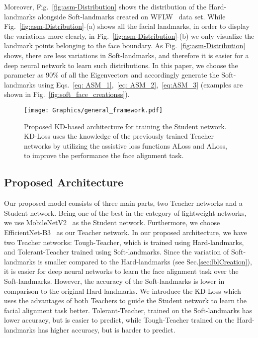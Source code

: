 \documentclass[times,twocolumn,final,authoryear]{elsarticle}
\begin{document}
Moreover, Fig.~\ref{fig:asm-Distribution} shows the distribution of the Hard-landmarks alongside Soft-landmarks created on WFLW~\cite{wu2018look} data set. While Fig.~\ref{fig:asm-Distribution}-(a) shows all the facial landmarks, in order to display the variations more clearly, in Fig.~\ref{fig:asm-Distribution}-(b) we only visualize the landmark points belonging to the face boundary. As Fig.~\ref{fig:asm-Distribution} shows, there are less variations in Soft-landmarks, and therefore it is easier for a deep neural network to learn such distributions. In this paper, we choose the parameter  as 90\% of all the Eigenvectors and accordingly generate the Soft-landmarks using Eqs.~\ref{eq: ASM_1},~\ref{eq: ASM_2},~\ref{eq:ASM_3} (examples are shown in Fig.~\ref{fig:soft_face_creationss}).

\begin{figure}[t!]
  \centering
  \texttt{[image: Graphics/general\_framework.pdf]}
  \caption{Proposed KD-based architecture for training the Student network. KD-Loss uses the knowledge of the previously trained Teacher networks by utilizing the assistive loss functions ALoss and ALoss, to improve the performance the face alignment task.}
  \label{fig:general_framework}
\end{figure}


\subsection{Proposed Architecture} \label{sec:proposedArch}
Our proposed model consists of three main parts, two Teacher networks and a Student network. Being one of the best in the category of lightweight networks, we use MobileNetV2~\cite{sandler2018MobileNetV2} as the Student network. Furthermore, we choose EfficientNet-B3~\cite{tan2019efficientnet} as our Teacher network. In our proposed architecture, we have two Teacher networks: Tough-Teacher, which is trained using Hard-landmarks, and Tolerant-Teacher trained using Soft-landmarks. Since the variation of Soft-landmarks is smaller compared to the Hard-landmarks (see Sec.\ref{sec:lblCreation}), it is easier for deep neural networks to learn the face alignment task over the Soft-landmarks. However, the accuracy of the Soft-landmarks is lower in comparison to the original Hard-landmarks. We introduce the KD-Loss which uses the advantages of both Teachers to guide the Student network to learn the facial alignment task better. Tolerant-Teacher, trained on the Soft-landmarks has lower accuracy, but is easier to predict, while Tough-Teacher trained on the Hard-landmarks has higher accuracy, but is harder to predict.
\end{document}
